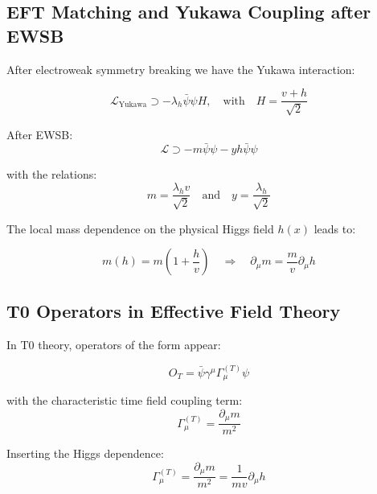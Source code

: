 	\subsection{EFT Matching and Yukawa Coupling after EWSB}
	\label{subsec:eft_matching}
	
	After electroweak symmetry breaking we have the Yukawa interaction:
	
	\begin{equation}
		\mathcal{L}_{\text{Yukawa}} \supset -\lambda_h \bar{\psi}\psi H, \quad \text{with} \quad H = \frac{v + h}{\sqrt{2}}
	\end{equation}
	
	After EWSB:
	\begin{equation}
		\mathcal{L} \supset -m \bar{\psi}\psi - y h \bar{\psi}\psi
	\end{equation}
	
	with the relations:
	\begin{equation}
		m = \frac{\lambda_h v}{\sqrt{2}} \quad \text{and} \quad y = \frac{\lambda_h}{\sqrt{2}}
	\end{equation}
	
	The local mass dependence on the physical Higgs field $h(x)$ leads to:
	
	\begin{equation}
		m(h) = m\left(1 + \frac{h}{v}\right) \quad \Rightarrow \quad \partial_\mu m = \frac{m}{v}\partial_\mu h
	\end{equation}
	
	\subsection{T0 Operators in Effective Field Theory}
	\label{subsec:t0_operators}
	
	In T0 theory, operators of the form appear:
	
	\begin{equation}
		O_T = \bar{\psi}\gamma^\mu\Gamma_\mu^{(T)}\psi
	\end{equation}
	
	with the characteristic time field coupling term:
	\begin{equation}
		\Gamma_\mu^{(T)} = \frac{\partial_\mu m}{m^2}
	\end{equation}
	
	Inserting the Higgs dependence:
	\begin{equation}
		\Gamma_\mu^{(T)} = \frac{\partial_\mu m}{m^2} = \frac{1}{mv}\partial_\mu h
	\end{equation}
	
